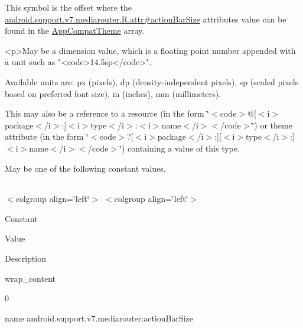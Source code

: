 This symbol is the offset where the \hyperlink{classandroid_1_1support_1_1v7_1_1mediarouter_1_1R_1_1attr_a56538f222ace8f340c54208e10527233}{android.\+support.\+v7.\+mediarouter.\+R.\+attr\#action\+Bar\+Size} attribute\textquotesingle{}s value can be found in the \hyperlink{classandroid_1_1support_1_1v7_1_1mediarouter_1_1R_1_1styleable_a4e3d3900c75d49aeb2f283cac00214d6}{App\+Compat\+Theme} array.

\begin{DoxyVerb}      <p>May be a dimension value, which is a floating point number appended with a unit such as "<code>14.5sp</code>".
\end{DoxyVerb}
 Available units are\+: px (pixels), dp (density-\/independent pixels), sp (scaled pixels based on preferred font size), in (inches), mm (millimeters). 

This may also be a reference to a resource (in the form \char`\"{}$<$code$>$@\mbox{[}$<$i$>$package$<$/i$>$\+:\mbox{]}$<$i$>$type$<$/i$>$\+:$<$i$>$name$<$/i$>$$<$/code$>$\char`\"{}) or theme attribute (in the form \char`\"{}$<$code$>$?\mbox{[}$<$i$>$package$<$/i$>$\+:\mbox{]}\mbox{[}$<$i$>$type$<$/i$>$\+:\mbox{]}$<$i$>$name$<$/i$>$$<$/code$>$\char`\"{}) containing a value of this type. 

May be one of the following constant values.

\tabulinesep=1mm
\begin{longtabu} spread 0pt [c]{*{0}{|X[-1]}|}
\hline
\end{longtabu}
$<$colgroup align=\char`\"{}left\char`\"{}$>$ $<$colgroup align=\char`\"{}left\char`\"{}$>$ 

Constant

Value

Description 

{\ttfamily wrap\+\_\+content}

0

name android.\+support.\+v7.\+mediarouter\+:action\+Bar\+Size \mbox{\label{classandroid_1_1support_1_1v7_1_1mediarouter_1_1R_1_1styleable_a7a7aca24fc568f1643e2776667ac41ba}} 
